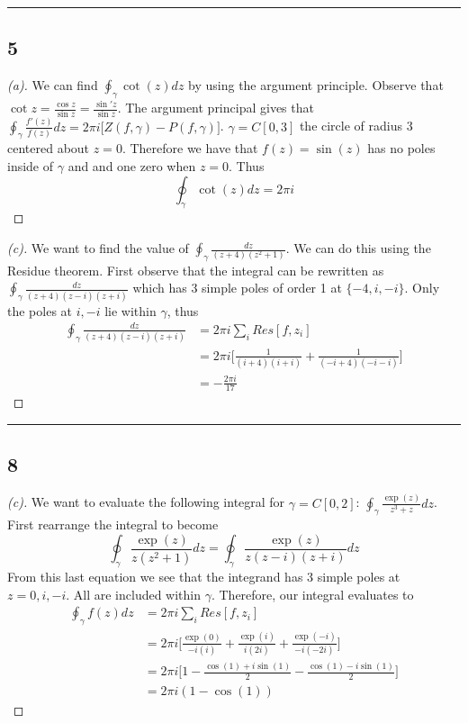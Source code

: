 \documentclass[a4paper, 11pt]{article}
\begin{document}
	
\par\noindent\rule{\textwidth}{0.4pt}
\subsection*{5}
	\begin{proof}[(a)]
		We can find $\oint_\gamma \cot(z) dz$ by using the argument principle. Observe that $\cot z = \frac{\cos z}{\sin z} = \frac{\sin'z}{\sin z}$. The argument principal gives that $\oint_\gamma \frac{f'(z)}{f(z)}dz =2\pi i \big[ Z(f, \gamma)-P(f,\gamma)\big]$. $\gamma = C[0,3]$ the circle of radius 3 centered about $z=0$. Therefore we have that $f(z)=\sin(z)$ has no poles inside of $\gamma$ and and one zero when $z=0$. Thus 
			\begin{equation*}
				\oint_\gamma \cot(z)dz = 2\pi i 
			\end{equation*}
	\end{proof}
	
	
	\begin{proof}[(c)]
		We want to find the value of $\oint_\gamma \frac{dz}{(z+4)(z^2+1)}$. We can do this using the Residue theorem. First observe that the integral can be rewritten as 	$\oint_\gamma \frac{dz}{(z+4)(z-i)(z+i)}$ which has 3 simple poles of order 1 at $\{-4,i,-i\}$. Only the poles at $i, -i$ lie within $\gamma$, thus
			\begin{align*}
				\oint_\gamma \frac{dz}{(z+4)(z-i)(z+i)} &= 2\pi i\sum_i Res[f, z_i] \\ 
					&= 2\pi i \big[\frac{1}{(i+4)(i+i)}+\frac{1}{(-i+4)(-i-i)}\big] \\ 
					&= -\frac{2\pi i}{17}
			\end{align*}
		
	\end{proof}
	
	
\par\noindent\rule{\textwidth}{0.4pt}
\subsection*{8}
	\begin{proof}[(c)]
		We want to evaluate the following integral for $\gamma = C[0, 2]$: $\oint_\gamma \frac{\exp(z)}{z^3+z}dz$. First rearrange the integral to become
			\begin{equation*}
				\oint_\gamma \frac{\exp(z)}{z(z^2+1)}dz = \oint_\gamma \frac{\exp(z)}{z(z-i)(z+i)}dz
			\end{equation*}
		From this last equation we see that the integrand has 3 simple poles at $z=0,i,-i$. All are included within $\gamma$. Therefore, our integral evaluates to
			\begin{align*}
				\oint_\gamma f(z)dz &= 2\pi i \sum_i Res[f, z_i] \\ 
					&= 2\pi i \Big[ \frac{\exp(0)}{-i(i)}+ \frac{\exp(i)}{i(2i)}+\frac{\exp(-i)}{-i(-2i)} \Big]  \\ 
					&= 2\pi i \big[ 1-\frac{\cos(1)+i\sin(1)}{2}-\frac{\cos(1)-i\sin(1)}{2} \big] \\
					&= 2\pi i (1-\cos(1))
			\end{align*}
	\end{proof}
	
\end{document}
